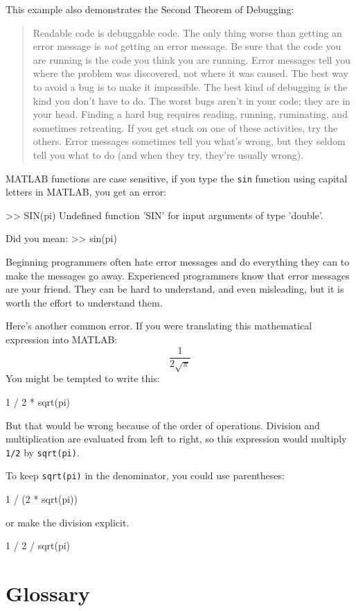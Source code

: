 \documentclass[
]{book}
\numberwithin{Answer}{chapter}
\numberwithin{Exercise}{chapter}
\newcommand{\displaythrm}[1]{%
    \ifthenelse{\equal{#1}{1}}%
        {Readable code is debuggable code.}{%
    \ifthenelse{\equal{#1}{2}}%
        {The only thing worse than getting an error message is {\em
         not} getting an error message.}{%
    \ifthenelse{\equal{#1}{3}}%
        {Be sure that the code you are running
         is the code you think you are running.}{%
    \ifthenelse{\equal{#1}{4}}%
        {Error messages tell you where the problem was discovered,
         not where it was caused.}{%
    \ifthenelse{\equal{#1}{5}}%
        {The best way to avoid a bug is to make it impossible.}{%
    \ifthenelse{\equal{#1}{6}}%
        {The best kind of debugging is the kind you don't have to do.}{%
    \ifthenelse{\equal{#1}{7}}%
        {The worst bugs aren't in your code; they are in your head.}{%
    \ifthenelse{\equal{#1}{8}}%
        {Finding a hard bug requires reading, running, ruminating,
         and sometimes retreating.  If you get stuck on one of these
         activities, try the others.}{%
    \ifthenelse{\equal{#1}{9}}%
        {Error messages sometimes tell you what's wrong, but they
         seldom tell you what to do (and when they try, they're usually
         wrong).}{%
    {}%
}}}}}}}}}}%
\begin{document}

This example also demonstrates the Second Theorem of Debugging:

\begin{quote}
\displaythrm{2}
\end{quote}

MATLAB functions are case sensitive, if you type the {\tt sin} function using capital letters in MATLAB, you get an error:


\begin{code}
>> SIN(pi)
Undefined function 'SIN' for input arguments of type 'double'.

Did you mean:
>> sin(pi)
\end{code}

Beginning programmers often hate error messages and do everything they
can to make the messages go away.  Experienced programmers know that error
messages are your friend.  They can be hard to understand, and even
misleading, but it is worth the effort to understand them.


Here's another common error.
If you were translating this mathematical expression into MATLAB:
%
\[ \frac{1}{2 \sqrt \pi} \]
%
You might be tempted to write this:

\begin{code}
1 / 2 * sqrt(pi)
\end{code}

But that would be wrong because of the order of operations.  Division and multiplication are evaluated from left to right, so this expression would multiply {\tt 1/2} by {\tt sqrt(pi)}.


To keep {\tt sqrt(pi)} in the denominator, you could use parentheses:

\begin{code}
1 / (2 * sqrt(pi))
\end{code}

or make the division explicit.

\begin{code}
1 / 2 / sqrt(pi)
\end{code}



\section{Glossary}
\end{document}

